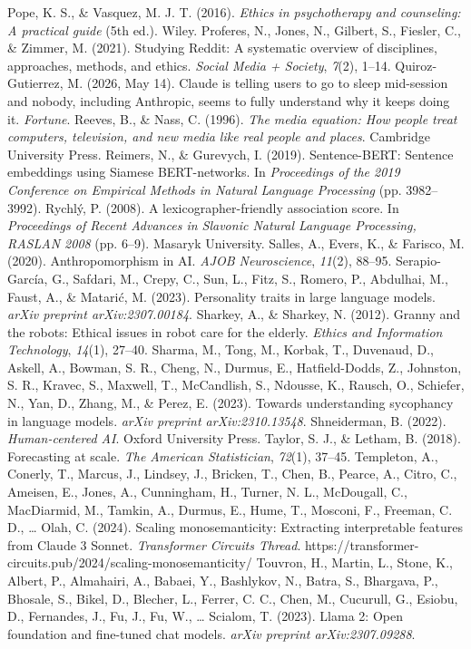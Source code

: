 \documentclass{obelus-preprint}
\begin{document}
Pope, K. S., \& Vasquez, M. J. T. (2016). \emph{Ethics in psychotherapy and counseling: A practical guide} (5th ed.). Wiley.
Proferes, N., Jones, N., Gilbert, S., Fiesler, C., \& Zimmer, M. (2021). Studying Reddit: A systematic overview of disciplines, approaches, methods, and ethics. \emph{Social Media + Society}, \emph{7}(2), 1--14.
Quiroz-Gutierrez, M. (2026, May 14). Claude is telling users to go to sleep mid-session and nobody, including Anthropic, seems to fully understand why it keeps doing it. \emph{Fortune}.
Reeves, B., \& Nass, C. (1996). \emph{The media equation: How people treat computers, television, and new media like real people and places}. Cambridge University Press.
Reimers, N., \& Gurevych, I. (2019). Sentence-BERT: Sentence embeddings using Siamese BERT-networks. In \emph{Proceedings of the 2019 Conference on Empirical Methods in Natural Language Processing} (pp. 3982--3992).
Rychlý, P. (2008). A lexicographer-friendly association score. In \emph{Proceedings of Recent Advances in Slavonic Natural Language Processing, RASLAN 2008} (pp. 6--9). Masaryk University.
Salles, A., Evers, K., \& Farisco, M. (2020). Anthropomorphism in AI. \emph{AJOB Neuroscience}, \emph{11}(2), 88--95.
Serapio-García, G., Safdari, M., Crepy, C., Sun, L., Fitz, S., Romero, P., Abdulhai, M., Faust, A., \& Matarić, M. (2023). Personality traits in large language models. \emph{arXiv preprint arXiv:2307.00184}.
Sharkey, A., \& Sharkey, N. (2012). Granny and the robots: Ethical issues in robot care for the elderly. \emph{Ethics and Information Technology}, \emph{14}(1), 27--40.
Sharma, M., Tong, M., Korbak, T., Duvenaud, D., Askell, A., Bowman, S. R., Cheng, N., Durmus, E., Hatfield-Dodds, Z., Johnston, S. R., Kravec, S., Maxwell, T., McCandlish, S., Ndousse, K., Rausch, O., Schiefer, N., Yan, D., Zhang, M., \& Perez, E. (2023). Towards understanding sycophancy in language models. \emph{arXiv preprint arXiv:2310.13548}.
Shneiderman, B. (2022). \emph{Human-centered AI}. Oxford University Press.
Taylor, S. J., \& Letham, B. (2018). Forecasting at scale. \emph{The American Statistician}, \emph{72}(1), 37--45.
Templeton, A., Conerly, T., Marcus, J., Lindsey, J., Bricken, T., Chen, B., Pearce, A., Citro, C., Ameisen, E., Jones, A., Cunningham, H., Turner, N. L., McDougall, C., MacDiarmid, M., Tamkin, A., Durmus, E., Hume, T., Mosconi, F., Freeman, C. D., \ldots{} Olah, C. (2024). Scaling monosemanticity: Extracting interpretable features from Claude 3 Sonnet. \emph{Transformer Circuits Thread}. https://transformer-circuits.pub/2024/scaling-monosemanticity/
Touvron, H., Martin, L., Stone, K., Albert, P., Almahairi, A., Babaei, Y., Bashlykov, N., Batra, S., Bhargava, P., Bhosale, S., Bikel, D., Blecher, L., Ferrer, C. C., Chen, M., Cucurull, G., Esiobu, D., Fernandes, J., Fu, J., Fu, W., \ldots{} Scialom, T. (2023). Llama 2: Open foundation and fine-tuned chat models. \emph{arXiv preprint arXiv:2307.09288}.
\end{document}
